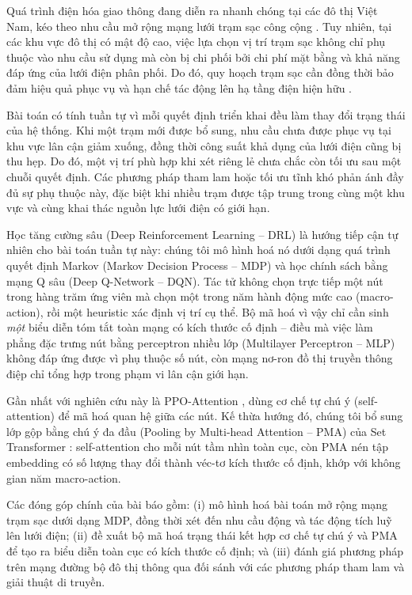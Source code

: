 \documentclass[10pt, conference, a4paper, compsocconf]{IEEEtran}
\begin{document}
Quá trình điện hóa giao thông đang diễn ra nhanh chóng tại các đô thị Việt Nam, kéo theo nhu cầu mở rộng mạng lưới trạm sạc công cộng \cite{veisi2025optimal, truc2024electric}. Tuy nhiên, tại các khu vực đô thị có mật độ cao, việc lựa chọn vị trí trạm sạc không chỉ phụ thuộc vào nhu cầu sử dụng mà còn bị chi phối bởi chi phí mặt bằng và khả năng đáp ứng của lưới điện phân phối. Do đó, quy hoạch trạm sạc cần đồng thời bảo đảm hiệu quả phục vụ và hạn chế tác động lên hạ tầng điện hiện hữu \cite{kumar2024hybrid}.

Bài toán có tính tuần tự vì mỗi quyết định triển khai đều làm thay đổi trạng thái của hệ thống. Khi một trạm mới được bổ sung, nhu cầu chưa được phục vụ tại khu vực lân cận giảm xuống, đồng thời công suất khả dụng của lưới điện cũng bị thu hẹp. Do đó, một vị trí phù hợp khi xét riêng lẻ chưa chắc còn tối ưu sau một chuỗi quyết định. Các phương pháp tham lam hoặc tối ưu tĩnh khó phản ánh đầy đủ sự phụ thuộc này, đặc biệt khi nhiều trạm được tập trung trong cùng một khu vực và cùng khai thác nguồn lực lưới điện có giới hạn.

Học tăng cường sâu (Deep Reinforcement Learning -- DRL) là hướng tiếp cận tự nhiên cho bài toán tuần tự này: chúng tôi mô hình hoá nó dưới dạng quá trình quyết định Markov (Markov Decision Process -- MDP) và học chính sách bằng mạng Q sâu (Deep Q-Network -- DQN). Tác tử không chọn trực tiếp một nút trong hàng trăm ứng viên mà chọn một trong năm hành động mức cao (macro-action), rồi một heuristic xác định vị trí cụ thể. Bộ mã hoá vì vậy chỉ cần sinh \emph{một} biểu diễn tóm tắt toàn mạng có kích thước cố định -- điều mà việc làm phẳng đặc trưng nút bằng perceptron nhiều lớp (Multilayer Perceptron -- MLP) không đáp ứng được vì phụ thuộc số nút, còn mạng nơ-ron đồ thị truyền thông điệp chỉ tổng hợp trong phạm vi lân cận giới hạn.

Gần nhất với nghiên cứu này là PPO-Attention \cite{liu2023optimal}, dùng cơ chế tự chú ý (self-attention) để mã hoá quan hệ giữa các nút. Kế thừa hướng đó, chúng tôi bổ sung lớp gộp bằng chú ý đa đầu (Pooling by Multi-head Attention -- PMA) của Set Transformer \cite{lee2019set}: self-attention cho mỗi nút tầm nhìn toàn cục, còn PMA nén tập embedding có số lượng thay đổi thành véc-tơ kích thước cố định, khớp với không gian năm macro-action.

Các đóng góp chính của bài báo gồm: (i) mô hình hoá bài toán mở rộng mạng trạm sạc dưới dạng MDP, đồng thời xét đến nhu cầu động và tác động tích luỹ lên lưới điện; (ii) đề xuất bộ mã hoá trạng thái kết hợp cơ chế tự chú ý và PMA để tạo ra biểu diễn toàn cục có kích thước cố định; và (iii) đánh giá phương pháp trên mạng đường bộ đô thị thông qua đối sánh với các phương pháp tham lam và giải thuật di truyền.
\end{document}
